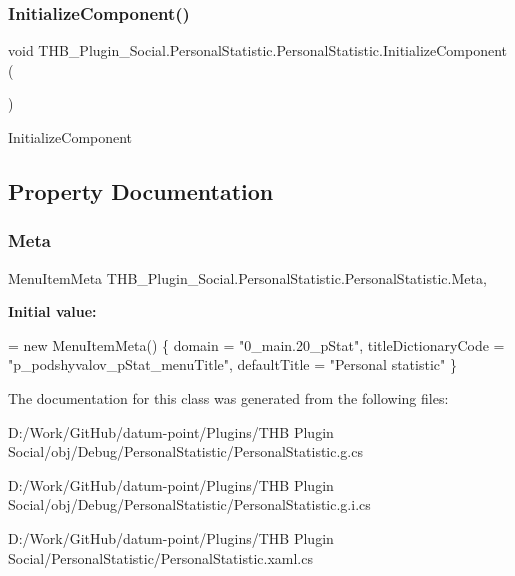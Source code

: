 \subsubsection{\texorpdfstring{Initialize\+Component()}{InitializeComponent()}\hspace{0.1cm}{\footnotesize\ttfamily [4/4]}}
{\footnotesize\ttfamily void T\+H\+B\+\_\+\+Plugin\+\_\+\+Social.\+Personal\+Statistic.\+Personal\+Statistic.\+Initialize\+Component (\begin{DoxyParamCaption}{ }\end{DoxyParamCaption})}



Initialize\+Component 



\subsection{Property Documentation}
\mbox{\label{class_t_h_b___plugin___social_1_1_personal_statistic_1_1_personal_statistic_a13f840788e043a6bd79c33adbd68f045}} 
\subsubsection{\texorpdfstring{Meta}{Meta}}
{\footnotesize\ttfamily Menu\+Item\+Meta T\+H\+B\+\_\+\+Plugin\+\_\+\+Social.\+Personal\+Statistic.\+Personal\+Statistic.\+Meta\hspace{0.3cm}{\ttfamily [get]}, {\ttfamily [set]}}

{\bfseries Initial value\+:}
\begin{DoxyCode}
= \textcolor{keyword}{new} MenuItemMeta()
        \{
            domain = \textcolor{stringliteral}{"0\_main.20\_pStat"},
            titleDictionaryCode = \textcolor{stringliteral}{"p\_podshyvalov\_pStat\_menuTitle"},
            defaultTitle = \textcolor{stringliteral}{"Personal statistic"}
        \}
\end{DoxyCode}


The documentation for this class was generated from the following files\+:\begin{DoxyCompactItemize}
\item 
D\+:/\+Work/\+Git\+Hub/datum-\/point/\+Plugins/\+T\+H\+B Plugin Social/obj/\+Debug/\+Personal\+Statistic/Personal\+Statistic.\+g.\+cs\item 
D\+:/\+Work/\+Git\+Hub/datum-\/point/\+Plugins/\+T\+H\+B Plugin Social/obj/\+Debug/\+Personal\+Statistic/Personal\+Statistic.\+g.\+i.\+cs\item 
D\+:/\+Work/\+Git\+Hub/datum-\/point/\+Plugins/\+T\+H\+B Plugin Social/\+Personal\+Statistic/Personal\+Statistic.\+xaml.\+cs\end{DoxyCompactItemize}
